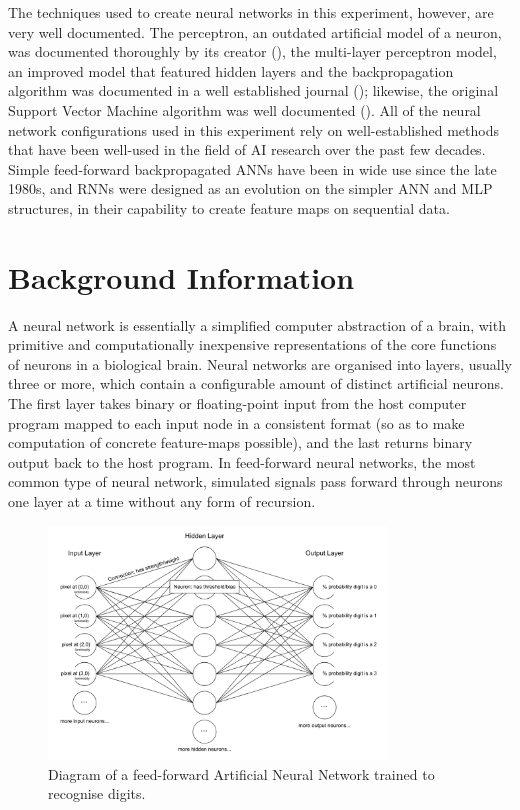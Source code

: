 \documentclass[]{report}
\begin{document}
The techniques used to create neural networks in this experiment, however, are very well documented. The perceptron, an outdated artificial model of a neuron, was documented thoroughly by its creator (\cite{rosenblatt1958perceptron}), the multi-layer perceptron model, an improved model that featured hidden layers and the backpropagation algorithm was documented in a well established journal (\cite{rumelhart1986learning}); likewise, the original Support Vector Machine algorithm was well documented (\cite{vapnik1995support}). All of the neural network configurations used in this experiment rely on well-established methods that have been well-used in the field of AI research over the past few decades. Simple feed-forward backpropagated ANNs have been in wide use since the late 1980s, and RNNs were designed as an evolution on the simpler ANN and MLP structures, in their capability to create feature maps on sequential data.

\section{Background Information}

A neural network is essentially a simplified computer abstraction of a brain, with primitive and computationally inexpensive representations of the core functions of neurons in a biological brain. Neural networks are organised into layers, usually three or more, which contain a configurable amount of distinct artificial neurons. The first layer takes binary or floating-point input from the host computer program mapped to each input node in a consistent format (so as to make computation of concrete feature-maps possible), and the last returns binary output back to the host program. In feed-forward neural networks, the most common type of neural network, simulated signals pass forward through neurons one layer at a time without any form of recursion.

\begin{figure}[H]
	\centering
	\includegraphics[width=0.8\textwidth]{network.png}
	\caption{Diagram of a feed-forward Artificial Neural Network trained to recognise digits.}
	\label{fig:network}
\end{figure}
\end{document}
